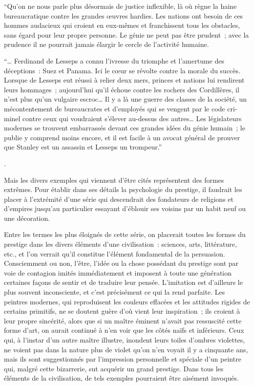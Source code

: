 \documentclass[french,twoside]{book} %
\begin{document}
{ “Qu’on ne nous parle plus désormais de justice inflexible, là où règne la haine bureaucratique contre les grandes œuvres hardies. Les nations ont besoin de ces hommes audacieux qui croient en eux-mêmes et franchissent tous les obstacles, sans égard pour leur propre personne. Le génie ne peut pas être prudent ; avec la prudence il ne pourrait jamais élargir le cercle de l’activité humaine.\par
 “… Ferdinand de Lesseps a connu l’ivresse du triomphe et l’amertume des déceptions : Suez et Panama. Ici le cœur se révolte contre la morale du succès. Lorsque de Lesseps eut réussi à relier deux mers, princes et nations lui rendirent leurs hommages ; aujourd’hui qu’il échoue contre les rochers des Cordillères, il n’est plus qu’un vulgaire escroc… Il y a là une guerre des classes de la société, un mécontentement de bureaucrates et d’employés qui se vengent par le code cri­minel contre ceux qui voudraient s’élever au-dessus des autres… Les législateurs modernes se trouvent embarrassés devant ces grandes idées du génie humain ; le publie y comprend moins encore, et il est facile à un avocat général de prouver que Stanley est un assassin et Lesseps un trompeur.”
}.\par
Mais les divers exemples qui viennent d’être cités représentent des formes extrêmes. Pour établir dans ses détails la psychologie du prestige, il faudrait les placer à l’extrémité d’une série qui descendrait des fondateurs de religions et d’empires jusqu’au particulier essayant d’éblouir ses voisins par un habit neuf ou une décoration.\par
Entre les termes les plus éloignés de cette série, on placerait toutes les formes du prestige dans les divers éléments d’une civilisation : sciences, arts, littérature, etc., et l’on verrait qu’il constitue l’élément fondamental de la persuasion. Consciemment ou non, l’être, l’idée ou la chose possédant du prestige sont par voie de contagion imités immédiatement et imposent à toute une génération certaines façons de sentir et de traduire leur pensée. L’imitation est d’ailleurs le plus souvent inconsciente, et c’est précisément ce qui la rend parfaite. Les peintres modernes, qui reproduisent les couleurs effacées et les attitudes rigides de certains primitifs, ne se doutent guère d’où vient leur inspiration ; ils croient à leur propre sincérité, alors que si un maître éminent n’avait pas ressuscité cette forme d’art, on aurait continué à n’en voir que les côtés naïfs et inférieurs. Ceux qui, à l’instar d’un autre maître illustre, inondent leurs toiles d’ombres violettes, ne voient pas dans la nature plus de violet qu’on n’en voyait il y a cinquante ans, mais ils sont suggestionnés par l’impression personnelle et spé­ciale d’un peintre qui, malgré cette bizarrerie, sut acquérir un grand prestige. Dans tous les éléments de la civilisation, de tels exemples pourraient être aisément invoqués.\par
\end{document}
